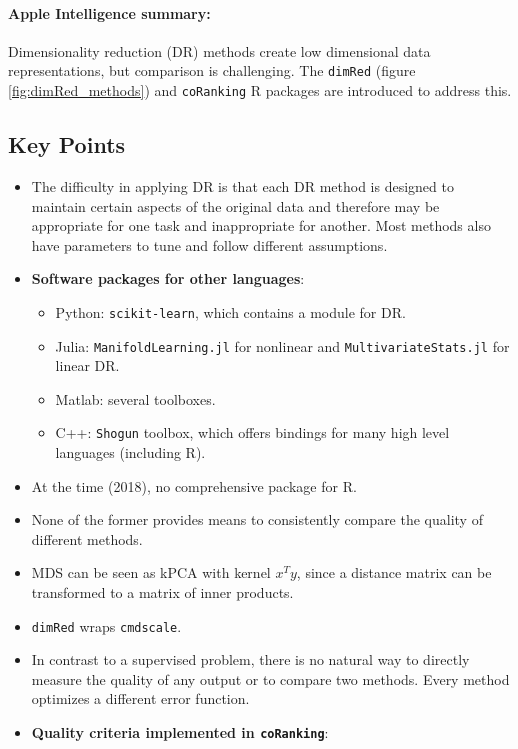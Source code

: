 \documentclass[a4paper,12pt]{article}
\begin{document}
\paragraph{Apple Intelligence summary:} Dimensionality reduction (DR) methods create low dimensional data representations, but comparison is challenging. The \texttt{dimRed} (figure \ref{fig:dimRed_methods}) and \texttt{coRanking} R packages are introduced to address this.

\subsection{Key Points}

\begin{itemize}
    \item The difficulty in applying DR is that each DR method is designed to maintain certain aspects of the original data and therefore may be appropriate for one task and inappropriate for another. Most methods also have parameters to tune and follow different assumptions.
    \item \textbf{Software packages for other languages}:
        \begin{itemize}
            \item Python: \texttt{scikit-learn}, which contains a module for DR.
            \item Julia: \texttt{ManifoldLearning.jl} for nonlinear and \texttt{MultivariateStats.jl} for linear DR.
            \item Matlab: several toolboxes.
            \item C++: \texttt{Shogun} toolbox, which offers bindings for many high level languages (including R).
        \end{itemize}
    \item At the time (2018), no comprehensive package for R.
    \item None of the former provides means to consistently compare the quality of different methods.
    \item MDS can be seen as kPCA with kernel $x^T y$, since a distance matrix can be transformed to a matrix of inner products.
    \item \texttt{dimRed} wraps \texttt{cmdscale}.
    \item In contrast to a supervised problem, there is no natural way to directly measure the quality of any output or to compare two methods. Every
    method optimizes a different error function.
    \item \textbf{Quality criteria implemented in \texttt{coRanking}}:

\end{itemize}
\end{document}
